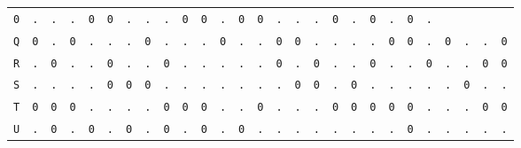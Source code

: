 \begin{figure}[H]
\begin{center}
{\begin{tabular}{c|cccccccccccccccccccccccccc}
				\texttt{0} & \texttt{.} & \texttt{.} & \texttt{.} &
				\texttt{0} & \texttt{0} & \texttt{.} & \texttt{.} &
				\texttt{.} & \texttt{0} & \texttt{0} & \texttt{.} &
				\texttt{0} & \texttt{0} & \texttt{.} & \texttt{.} &
				\texttt{.} & \texttt{0} & \texttt{.} & \texttt{0} &
				\texttt{.} & \texttt{0} & \texttt{.}                             \\
				\texttt{Q} & \texttt{0} & \texttt{.} & \texttt{0} &
				\texttt{.} & \texttt{.} & \texttt{.} & \texttt{0} &
				\texttt{.} & \texttt{.} & \texttt{.} & \texttt{0} &
				\texttt{.} & \texttt{.} & \texttt{0} & \texttt{0} &
				\texttt{.} & \texttt{.} & \texttt{.} & \texttt{.} &
				\texttt{0} & \texttt{0} & \texttt{.} & \texttt{0} &
				\texttt{.} & \texttt{.} & \texttt{0}                             \\
				\texttt{R} & \texttt{.} & \texttt{0} & \texttt{.} &
				\texttt{.} & \texttt{0} & \texttt{.} & \texttt{.} &
				\texttt{0} & \texttt{.} & \texttt{.} & \texttt{.} &
				\texttt{.} & \texttt{.} & \texttt{0} & \texttt{.} &
				\texttt{0} & \texttt{.} & \texttt{.} & \texttt{0} &
				\texttt{.} & \texttt{.} & \texttt{0} & \texttt{.} &
				\texttt{.} & \texttt{0} & \texttt{0}                             \\
				\texttt{S} & \texttt{.} & \texttt{.} & \texttt{.} &
				\texttt{.} & \texttt{0} & \texttt{0} & \texttt{0} &
				\texttt{.} & \texttt{.} & \texttt{.} & \texttt{.} &
				\texttt{.} & \texttt{.} & \texttt{.} & \texttt{0} &
				\texttt{0} & \texttt{.} & \texttt{0} & \texttt{.} &
				\texttt{.} & \texttt{.} & \texttt{.} & \texttt{.} &
				\texttt{0} & \texttt{.} & \texttt{.}                             \\
				\texttt{T} & \texttt{0} & \texttt{0} & \texttt{0} &
				\texttt{.} & \texttt{.} & \texttt{.} & \texttt{.} &
				\texttt{0} & \texttt{0} & \texttt{0} & \texttt{.} &
				\texttt{.} & \texttt{0} & \texttt{.} & \texttt{.} &
				\texttt{.} & \texttt{0} & \texttt{0} & \texttt{0} &
				\texttt{0} & \texttt{0} & \texttt{.} & \texttt{.} &
				\texttt{.} & \texttt{0} & \texttt{0}                             \\
				\texttt{U} & \texttt{.} & \texttt{0} & \texttt{.} &
				\texttt{0} & \texttt{.} & \texttt{0} & \texttt{.} &
				\texttt{0} & \texttt{.} & \texttt{0} & \texttt{.} &
				\texttt{0} & \texttt{.} & \texttt{.} & \texttt{.} &
				\texttt{.} & \texttt{.} & \texttt{.} & \texttt{.} &
				\texttt{.} & \texttt{0} & \texttt{.} & \texttt{.} &
				\texttt{.} & \texttt{.} & \texttt{.}                             \\

\end{tabular}}
\end{center}
\end{figure}
